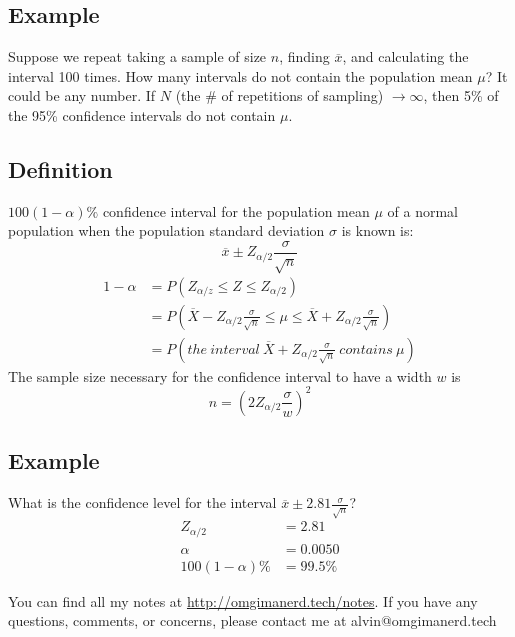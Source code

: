 \documentclass{math}
\begin{document}
\subsection*{Example}
Suppose we repeat taking a sample of size \( n \), finding \( \overline{x} \),
and calculating the interval 100 times. How many intervals do not contain the
population mean \( \mu \)? It could be any number. If \( N \) (the \# of
repetitions of sampling) \( \to\infty \), then 5\% of the 95\% confidence
intervals do not contain \( \mu \).

\subsection*{Definition}
\( 100(1-\alpha)\% \) confidence interval for the population mean \( \mu \) of
a normal population when the population standard deviation \( \sigma \) is known
is:
\[ \overline{x}\pm Z_{\alpha/2}\frac{\sigma}{\sqrt{n}} \]
\begin{align*}
  1-\alpha &= P(Z_{\alpha/z}\leq Z\leq Z_{\alpha/2}) \\
  &= P(\overline{X}-Z_{\alpha/2}\frac{\sigma}{\sqrt{n}}\leq \mu\leq
    \overline{X}+Z_{\alpha/2}\frac{\sigma}{\sqrt{n}}) \\
  &= P(the\ interval\ \overline{X}+Z_{\alpha/2}\frac{\sigma}{\sqrt{n}}
    \ contains\ \mu)
\end{align*}
The sample size necessary for the confidence interval to have a width \( w \)
is
\[ n = (2Z_{\alpha/2}\frac{\sigma}{w})^{2} \]

\subsection*{Example}
What is the confidence level for the interval \( \overline{x}\pm2.81
\frac{\sigma}{\sqrt{n}} \)?
\begin{align*}
  Z_{\alpha/2} &= 2.81 \\
  \alpha &= 0.0050 \\
  100(1-\alpha)\% &= 99.5\%
\end{align*}

\begin{center}
  You can find all my notes at \url{http://omgimanerd.tech/notes}. If you have
  any questions, comments, or concerns, please contact me at
  alvin@omgimanerd.tech
\end{center}
\end{document}
